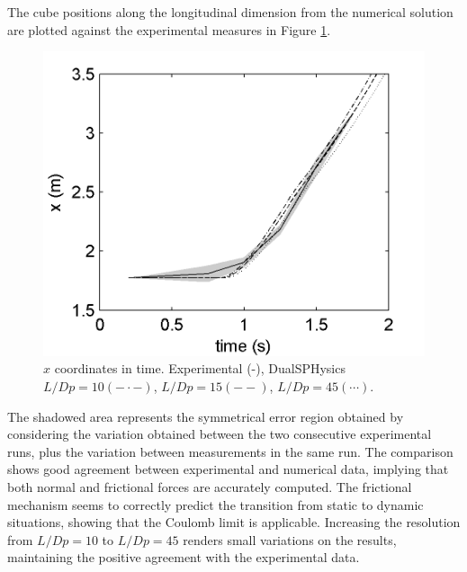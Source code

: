 The cube positions along the longitudinal dimension from the numerical solution are plotted against the experimental measures in Figure \ref{fig:cube1_d2_I}.
%
\begin{figure}[ht!]
	\centering
	\includegraphics[width=0.45\linewidth]{Figures/5.Chapter/Fig_3}
	\caption{$x$ coordinates in time. Experimental (-), DualSPHysics $L/Dp=10 (- \cdot -)$, $L/Dp=15 (- -)$, $L/Dp=45 (\cdots)$.}
	\label{fig:cube1_d2_I} 
\end{figure}
%

The shadowed area represents the symmetrical error region obtained by considering the variation obtained between the two consecutive experimental runs, plus the variation between measurements in the same run. The comparison shows good agreement between experimental and numerical data, implying that both normal and frictional forces are accurately computed. The frictional mechanism seems to correctly predict the transition from static to dynamic situations, showing that the Coulomb limit is applicable. Increasing the resolution from $L/Dp=10$ to $L/Dp=45$ renders small variations on the results, maintaining the positive agreement with the experimental data.



